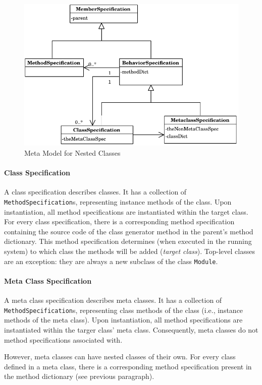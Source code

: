 \begin{figure}
	\centering
	\includegraphics[scale=1]{metamodel.pdf}
	\caption{Meta Model for Nested Classes}
	\label{fig:impl_meta_model}
\end{figure}

\paragraph{Class Specification}
A class specification describes classes. It has a collection of \texttt{MethodSpecification}s, representing instance methods of the class. Upon instantiation, all method specifications are instantiated within the target class. For every class specification, there is a corresponding method specification containing the source code of the class generator method in the parent's method dictionary. This method specification determines (when executed in the running system) to which class the methods will be added (\emph{target class}). Top-level classes are an exception: they are always a new subclass of the class \texttt{Module}.

\paragraph{Meta Class Specification}
A meta class specification describes meta classes. It has a collection of \texttt{MethodSpecification}s, representing class methods of the class (i.e., instance methods of the meta class). Upon instantiation, all method specifications are instantiated within the targer class' meta class. Consequently, meta classes do not method specifications associated with.

However, meta classes can have nested classes of their own. For every class defined in a meta class, there is a corresponding method specification present in the method dictionary (see previous paragraph).

